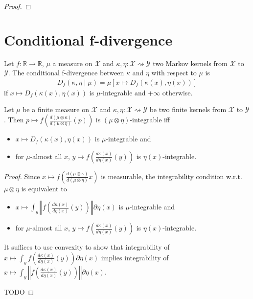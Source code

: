 \begin{proof}
\end{proof}

\section{Conditional f-divergence}

\begin{definition}
  \label{def:condFDiv}
  \leanok
  Let $f : \mathbb{R} \to \mathbb{R}$, $\mu$ a measure on $\mathcal X$ and $\kappa, \eta : \mathcal X \rightsquigarrow \mathcal Y$ two Markov kernels from $\mathcal X$ to $\mathcal Y$. The conditional f-divergence between $\kappa$ and $\eta$ with respect to $\mu$ is
  \begin{align*}
  D_f(\kappa, \eta \mid \mu) = \mu\left[x \mapsto D_f(\kappa(x), \eta(x))\right]
  \end{align*}
  if $x \mapsto D_f(\kappa(x), \eta(x))$ is $\mu$-integrable and $+\infty$ otherwise.
\end{definition}

\begin{lemma}
  \label{lem:integrable_fDiv_compProd_iff}
  \leanok
  Let $\mu$ be a finite measure on $\mathcal X$ and $\kappa, \eta : \mathcal X \rightsquigarrow \mathcal Y$ be two finite kernels from $\mathcal X$ to $\mathcal Y$.
  Then $p \mapsto f \left(\frac{d(\mu \otimes \kappa)}{d(\mu \otimes \eta)}(p)\right)$ is $(\mu \otimes \eta)$-integrable iff
  \begin{itemize}
    \item $x \mapsto D_f(\kappa(x), \eta(x))$ is $\mu$-integrable and
    \item for $\mu$-almost all $x$, $y \mapsto f \left( \frac{d\kappa(x)}{d\eta(x)}(y) \right)$ is $\eta(x)$-integrable. 
  \end{itemize}
\end{lemma}

\begin{proof}
Since $x \mapsto f \left(\frac{d(\mu \otimes \kappa)}{d(\mu \otimes \eta)} x \right)$ is measurable, the integrability condition w.r.t. $\mu \otimes \eta$ is equivalent to
\begin{itemize}
    \item $x \mapsto \int_y \left\Vert f \left( \frac{d\kappa(x)}{d\eta(x)}(y) \right) \right\Vert \partial \eta(x)$ is $\mu$-integrable and
    \item for $\mu$-almost all $x$, $y \mapsto f \left( \frac{d\kappa(x)}{d\eta(x)}(y) \right)$ is $\eta(x)$-integrable. 
  \end{itemize}
It suffices to use convexity to show that integrability of $x \mapsto \int_y f \left( \frac{d\kappa(x)}{d\eta(x)}(y) \right) \partial \eta(x)$ implies integrability of $x \mapsto \int_y \left\Vert f \left( \frac{d\kappa(x)}{d\eta(x)}(y) \right) \right\Vert \partial \eta(x)$.

TODO
\end{proof}

